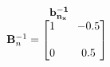 \documentclass[preview]{standalone}
\begin{document}
\begin{align*}
\begin{array}{c}\begin{matrix}\hspace{1cm} \mathbf{b^{-1}_{n_x}}  \quad \hspace{0.5cm} \end{matrix} \\  \mathbf{B}^{-1}_n = \begin{bmatrix} 1 & \quad -0.5 \\ \\0 & \quad 0.5 \end{bmatrix} \end{array}
\end{align*}
\end{document}
